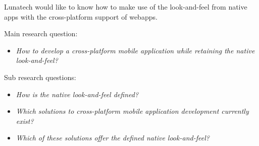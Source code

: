 Lunatech would like to know how to make use of the look-and-feel from native apps with the cross-platform support of webapps.


Main research question:
\begin{itemize}
\item \emph{How to develop a cross-platform mobile application while retaining the native look-and-feel?}
\end{itemize}

\noindent Sub research questions:
\begin{itemize}
\item \emph{How is the native look-and-feel defined?}
\item \emph{Which solutions to cross-platform mobile application development currently exist?}
\item \emph{Which of these solutions offer the defined native look-and-feel?}
\end{itemize}